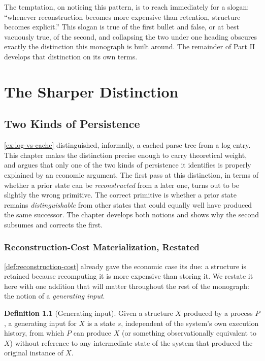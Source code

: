 \documentclass[11pt]{book}
\theoremstyle{plain}
\theoremstyle{definition}
\newtheorem{definition}[theorem]{Definition}
\theoremstyle{remark}
\begin{document}
The temptation, on noticing this pattern, is to reach immediately for
a slogan: \enquote{whenever reconstruction becomes more expensive than
retention, structure becomes explicit.} This slogan is true of the
first bullet and false, or at best vacuously true, of the second, and
collapsing the two under one heading obscures exactly the distinction
this monograph is built around. The remainder of Part II develops that
distinction on its own terms.

\part{The Sharper Distinction}
\chapter{Two Kinds of Persistence}
\label{ch:two-kinds-of-persistence}

\cref{ex:log-vs-cache} distinguished, informally, a cached parse tree
from a log entry. This chapter makes the distinction precise enough to
carry theoretical weight, and argues that only one of the two kinds of
persistence it identifies is properly explained by an economic
argument. The first pass at this distinction, in terms of whether a
prior state can be \emph{reconstructed} from a later one, turns out to
be slightly the wrong primitive. The correct primitive is whether a
prior state remains \emph{distinguishable} from other states that
could equally well have produced the same successor. The chapter
develops both notions and shows why the second subsumes and corrects
the first.

\section{Reconstruction-Cost Materialization, Restated}

\cref{def:reconstruction-cost} already gave the economic case its due:
a structure is retained because recomputing it is more expensive than
storing it. We restate it here with one addition that will matter
throughout the rest of the monograph: the notion of a \emph{generating
input}.

\begin{definition}[Generating input]
\label{def:generating-input}
Given a structure $X$ produced by a process $P$, a generating input
for $X$ is a state $s$, independent of the system's own execution
history, from which $P$ can produce $X$ (or something observationally
equivalent to $X$) without reference to any intermediate state of the
system that produced the original instance of $X$.
\end{definition}
\end{document}
